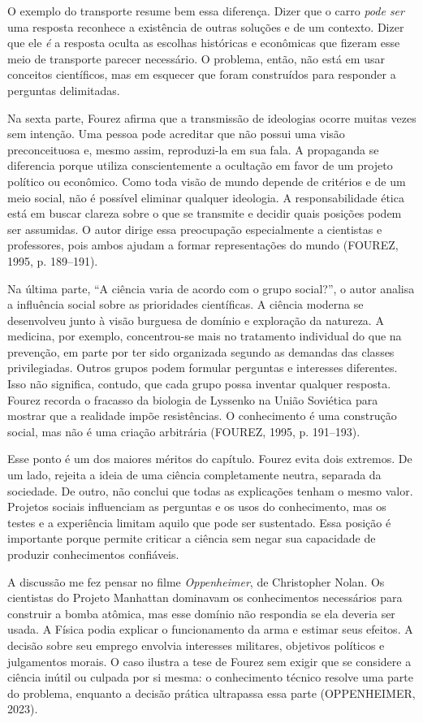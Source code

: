 \documentclass[12pt,a4paper]{article}
\begin{document}
O exemplo do transporte resume bem essa diferença. Dizer que o carro \textit{pode ser} uma resposta reconhece a existência de outras soluções e de um contexto. Dizer que ele \textit{é} a resposta oculta as escolhas históricas e econômicas que fizeram esse meio de transporte parecer necessário. O problema, então, não está em usar conceitos científicos, mas em esquecer que foram construídos para responder a perguntas delimitadas.

Na sexta parte, Fourez afirma que a transmissão de ideologias ocorre muitas vezes sem intenção. Uma pessoa pode acreditar que não possui uma visão preconceituosa e, mesmo assim, reproduzi-la em sua fala. A propaganda se diferencia porque utiliza conscientemente a ocultação em favor de um projeto político ou econômico. Como toda visão de mundo depende de critérios e de um meio social, não é possível eliminar qualquer ideologia. A responsabilidade ética está em buscar clareza sobre o que se transmite e decidir quais posições podem ser assumidas. O autor dirige essa preocupação especialmente a cientistas e professores, pois ambos ajudam a formar representações do mundo (FOUREZ, 1995, p. 189--191).

Na última parte, ``A ciência varia de acordo com o grupo social?'', o autor analisa a influência social sobre as prioridades científicas. A ciência moderna se desenvolveu junto à visão burguesa de domínio e exploração da natureza. A medicina, por exemplo, concentrou-se mais no tratamento individual do que na prevenção, em parte por ter sido organizada segundo as demandas das classes privilegiadas. Outros grupos podem formular perguntas e interesses diferentes. Isso não significa, contudo, que cada grupo possa inventar qualquer resposta. Fourez recorda o fracasso da biologia de Lyssenko na União Soviética para mostrar que a realidade impõe resistências. O conhecimento é uma construção social, mas não é uma criação arbitrária (FOUREZ, 1995, p. 191--193).

Esse ponto é um dos maiores méritos do capítulo. Fourez evita dois extremos. De um lado, rejeita a ideia de uma ciência completamente neutra, separada da sociedade. De outro, não conclui que todas as explicações tenham o mesmo valor. Projetos sociais influenciam as perguntas e os usos do conhecimento, mas os testes e a experiência limitam aquilo que pode ser sustentado. Essa posição é importante porque permite criticar a ciência sem negar sua capacidade de produzir conhecimentos confiáveis.

A discussão me fez pensar no filme \textit{Oppenheimer}, de Christopher Nolan. Os cientistas do Projeto Manhattan dominavam os conhecimentos necessários para construir a bomba atômica, mas esse domínio não respondia se ela deveria ser usada. A Física podia explicar o funcionamento da arma e estimar seus efeitos. A decisão sobre seu emprego envolvia interesses militares, objetivos políticos e julgamentos morais. O caso ilustra a tese de Fourez sem exigir que se considere a ciência inútil ou culpada por si mesma: o conhecimento técnico resolve uma parte do problema, enquanto a decisão prática ultrapassa essa parte (OPPENHEIMER, 2023).
\end{document}
